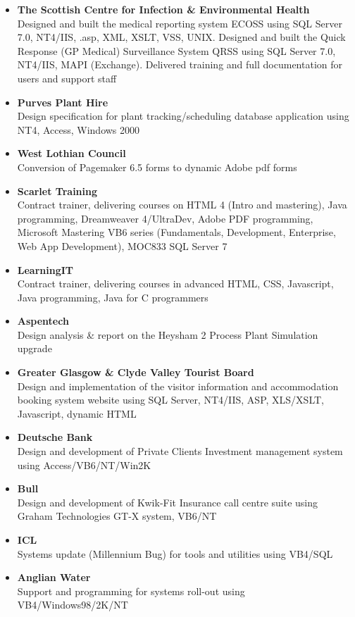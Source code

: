 \documentclass[10pt]{article}
\newenvironment{outerlist}[1][\enskip\textbullet]%
        {\begin{itemize}[#1]}{\end{itemize}%
         \vspace{-.6\baselineskip}}
\begin{document}
\begin{outerlist}
\begin{outerlist}
\item \textbf{The Scottish Centre for Infection \& Environmental Health} \\ %
		Designed and built the medical reporting system ECOSS using SQL Server 7.0, NT4/IIS, .asp, XML, XSLT, VSS, UNIX. Designed and built the Quick Response (GP Medical) Surveillance System QRSS using SQL Server 7.0, NT4/IIS, MAPI (Exchange). Delivered training and full documentation for users and support staff
\item \textbf{Purves Plant Hire} \\ %
	Design specification for plant tracking/scheduling database application using NT4, Access, Windows 2000
\item \textbf{West Lothian Council}\\ %
	Conversion of Pagemaker 6.5 forms to dynamic Adobe pdf forms 
\item \textbf{Scarlet Training} \\%
	Contract trainer, delivering courses on HTML 4 (Intro and mastering), Java programming, Dreamweaver 4/UltraDev, Adobe PDF programming, Microsoft Mastering VB6 series (Fundamentals, Development, Enterprise, Web App Development), MOC833 SQL Server 7
\item \textbf{LearningIT} \\ %
	Contract trainer, delivering courses in advanced HTML, CSS, Javascript, Java programming, Java for C programmers
\item \textbf{Aspentech} \\ %
	Design analysis \& report on the Heysham 2 Process Plant Simulation upgrade
\item \textbf{Greater Glasgow \& Clyde Valley Tourist Board} \\ %
	Design and implementation of the visitor information and accommodation booking system website using SQL Server, NT4/IIS, ASP, XLS/XSLT, Javascript, dynamic HTML
\item \textbf{Deutsche Bank} \\ %
	Design and development of Private Clients Investment management system using Access/VB6/NT/Win2K
\item \textbf{Bull} \\ %
	Design and development of Kwik-Fit Insurance call centre suite using Graham Technologies GT-X system, VB6/NT
\item \textbf{ICL} \\ %
	Systems update (Millennium Bug) for tools and utilities using VB4/SQL
\item \textbf{Anglian Water} \\ %
	Support and programming for systems roll-out using VB4/Windows98/2K/NT

\end{outerlist}
\end{outerlist}
\end{document}
